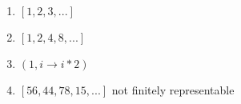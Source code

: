 \begin{enumerate}
\item $[1,2,3,...]$
\item $[1,2,4,8,...]$
\item $(1, i \to i * 2)$
\item $[56,44,78,15,...]$ not finitely representable
\end{enumerate}
